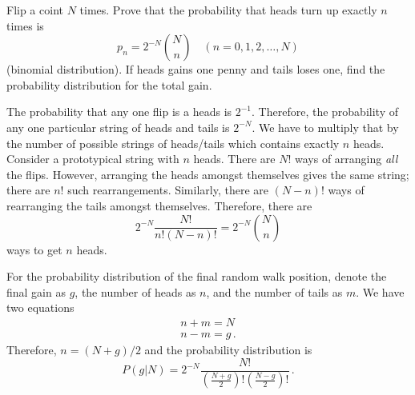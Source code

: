 

Flip a coint $N$ times.
Prove that the probability that heads turn up exactly $n$ times is
\begin{equation*}
p_n = 2^{-N} \binom{N}{n} \quad (n=0,1,2,\ldots,N)
\end{equation*}
(binomial distribution). If heads gains one penny and tails loses one, find the probability distribution for the total gain.


The probability that any one flip is a heads is $2^{-1}$.
Therefore, the probability of any one particular string of heads and tails is $2^{-N}$.
We have to multiply that by the number of possible strings of heads/tails which contains exactly $n$ heads.
Consider a prototypical string with $n$ heads.
There are $N!$ ways of arranging \emph{all} the flips.
However, arranging the heads amongst themselves gives the same string; there are $n!$ such rearrangements.
Similarly, there are $(N-n)!$ ways of rearranging the tails amongst themselves.
Therefore, there are 
\begin{equation*}
2^{-N} \frac{N!}{n! (N-n)!} = 2^{-N} \binom{N}{n}
\end{equation*}
ways to get $n$ heads.

For the probability distribution of the final random walk position, denote the final gain as $g$, the number of heads as $n$, and the number of tails as $m$.
We have two equations
\begin{align*}
n + m = N \\
n - m = g \, .
\end{align*}
Therefore, $n = (N + g) / 2$ and the probability distribution is
\begin{equation*}
P(g | N) = 2^{-N} \frac{N!}{\left( \frac{N+g}{2} \right)! \left( \frac{N-g}{2}\right)!} \, .
\end{equation*}
